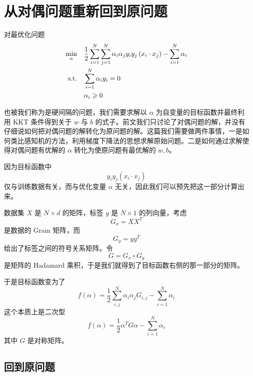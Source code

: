 \section{从对偶问题重新回到原问题}

对最优化问题
\begin{align}
\min_\alpha\quad & \frac{1}{2}\sum_{i=1}^{N}\sum_{j=1}^{N}
\alpha_i\alpha_j y_i y_j \left( x_i\cdot x_j\right) -\sum_{i=1}^{N} \alpha_i \\
\text{s.t.} \quad & \sum_{i=1}^{N} \alpha_i y_i =0  \\
& \alpha_i \geqslant 0 \notag
\end{align}

也被我们称为是硬间隔的问题，我们需要求解以 $\alpha$ 为自变量的目标函数并最终利用 KKT 条件得到关于 $w$ 与 $b$ 的式子。前文我们只讨论了对偶问题的解，并没有仔细说如何把对偶问题的解转化为原问题的解。这篇我们需要做两件事情，一是如何类比感知机的方法，利用梯度下降法的思想求解原始问题。二是如何通过求解使得对偶问题有优解的 $\alpha$ 转化为使原问题有最优解的 $w,b$。

因为目标函数中
\begin{equation}
y_i y_j(x_i\cdot x_j)
\end{equation}
仅与训练数据有关，而与优化变量 $\alpha$ 无关，因此我们可以预先把这一部分计算出来。

数据集 $X$ 是 $N\times d$ 的矩阵，标签 $y$ 是 $N\times 1$ 的列向量，考虑
\begin{equation}
G_x = XX^T
\end{equation}
是数据的 Gram 矩阵，而
\begin{equation}
G_y = yy^T
\end{equation}
给出了标签之间的符号关系矩阵。令
\begin{equation}
G = G_x \circ G_y
\end{equation}
是矩阵的 Hadamard 乘积，于是我们就得到了目标函数右侧的那一部分的矩阵。

于是目标函数变为了
\begin{equation}
f(\alpha) = \frac{1}{2} \sum_{i, j}^{N} \alpha_i \alpha_j G_{i,j} - \sum_{i=1}^{N} \alpha_i
\end{equation}
这个本质上是二次型
\begin{equation}
f(\alpha) = \frac{1}{2} \alpha^T G\alpha - \sum_{i=1}^{N} \alpha_i
\end{equation}
其中 $G$ 是对称矩阵。

\subsection{回到原问题}

